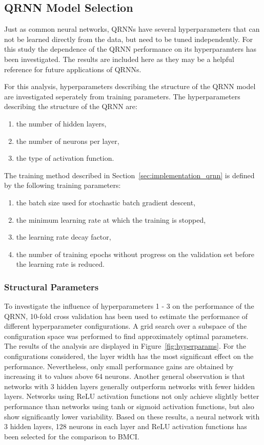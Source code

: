 \documentclass[journal abbreviation, manuscript]{copernicus}
\begin{document}
\subsection{QRNN Model Selection}

Just as common neural networks, QRNNs have several hyperparameters that can not
be learned directly from the data, but need to be tuned independently. For this
study the dependence of the QRNN performance on its hyperparamters has been
investigated. The results are included here as they may be a helpful reference
for future applications of QRNNs.

For this analysis, hyperparameters describing the structure of the QRNN model
are investigated seperately from training parameters. The hyperparameters
describing the structure of the QRNN are:
\begin{enumerate}
  \item the number of hidden layers,
  \item the number of neurons per layer,
  \item the type of activation function.
  \setcounter{enumic}{\value{enumi}}
\end{enumerate}
The training method  described in Section~\ref{sec:implementation_qrnn} is
defined by the following training parameters:
\begin{enumerate}
  \setcounter{enumi}{\value{enumic}}
  \item the batch size used for stochastic batch gradient descent,
  \item the minimum learning rate at which the training is stopped,
  \item the learning rate decay factor,
  \item the number of training epochs without progress on the validation set
     before the learning rate is reduced.
\end{enumerate}

\subsubsection{Structural Parameters}

  To investigate the influence of hyperparameters 1 - 3 on the performance of
the QRNN, 10-fold cross validation has been used to estimate the performance of
different hyperparameter configurations. A grid search over a subspace of the
configuration space was performed to find approximately optimal parameters. The
results of the analysis are displayed in Figure~\ref{fig:hyperparams}. For the
configurations considered, the layer width has the most significant effect on
the performance. Nevertheless, only small performance gains are obtained by
increasing it to values above 64 neurons. Another general observation is that
networks with 3 hidden layers generally outperform networks with fewer hidden
layers. Networks using ReLU activation functions not only achieve slightly better
performance than networks using tanh or sigmoid activation functions, but also
show significantly lower variability. Based on these results, a neural network
with 3 hidden layers, 128 neurons in each layer and ReLU activation functions
 has been selected for the comparison to BMCI.
\end{document}
